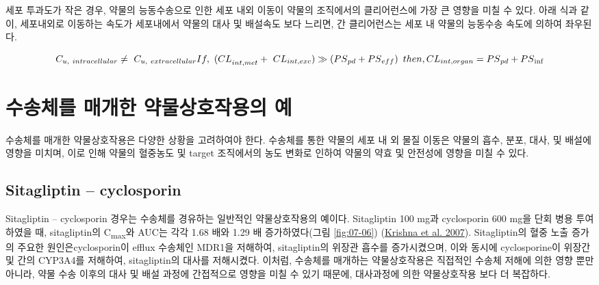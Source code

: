 \documentclass[
  11pt,
  krantz2, a4paper, twoside]{krantz}
\begin{document}
세포 투과도가 작은 경우, 약물의 능동수송으로 인한 세포 내외 이동이
약물의 조직에서의 클리어런스에 가장 큰 영향을 미칠 수 있다. 아래 식과
같이, 세포내외로 이동하는 속도가 세포내에서 약물의 대사 및 배설속도
보다 느리면, 간 클리어런스는 세포 내 약물의 능동수송 속도에 의하여
좌우된다.

\[
C_{u,\ intracellular} \neq \ C_{u,\ extracellular} \\
{If,\ (CL}_{int,met} + \ {CL}_{int,exc}) \gg \left( {PS}_{pd} + {PS}_{eff} \right)\ then, \\
{CL}_{int,organ} = {PS}_{pd} + {PS}_{\inf}
\]

\hypertarget{uxc218uxc1a1uxccb4uxb97c-uxb9e4uxac1cuxd55c-uxc57duxbb3cuxc0c1uxd638uxc791uxc6a9uxc758-uxc608}{%
\section{수송체를 매개한 약물상호작용의 예}\label{uxc218uxc1a1uxccb4uxb97c-uxb9e4uxac1cuxd55c-uxc57duxbb3cuxc0c1uxd638uxc791uxc6a9uxc758-uxc608}}

수송체를 매개한 약물상호작용은 다양한 상황을 고려하여야 한다. 수송체를
통한 약물의 세포 내 외 물질 이동은 약물의 흡수, 분포, 대사, 및 배설에
영향을 미치며, 이로 인해 약물의 혈중농도 및 target 조직에서의 농도
변화로 인하여 약물의 약효 및 안전성에 영향을 미칠 수 있다.

\hypertarget{sitagliptin-cyclosporin}{%
\subsection{Sitagliptin -- cyclosporin}\label{sitagliptin-cyclosporin}}

Sitagliptin -- cyclosporin 경우는 수송체를 경유하는 일반적인
약물상호작용의 예이다. Sitagliptin 100 mg과 cyclosporin 600 mg을 단회
병용 투여하였을 때, sitagliptin의 C\textsubscript{max}와 AUC는 각각 1.68 배와 1.29 배
증가하였다(그림 \ref{fig:07-06}) (\protect\hyperlink{ref-krishna2007effect}{Krishna et al. 2007}). Sitagliptin의 혈중 노출
증가의 주요한 원인은cyclosporin이 efflux 수송체인 MDR1을 저해하여,
sitagliptin의 위장관 흡수를 증가시켰으며, 이와 동시에 cyclosporine이
위장간 및 간의 CYP3A4를 저해하여, sitagliptin의 대사를 저해시켰다.
이처럼, 수송체를 매개하는 약물상호작용은 직접적인 수송체 저해에 의한
영향 뿐만 아니라, 약물 수송 이후의 대사 및 배설 과정에 간접적으로 영향을
미칠 수 있기 때문에, 대사과정에 의한 약물상호작용 보다 더 복잡하다.
\end{document}
